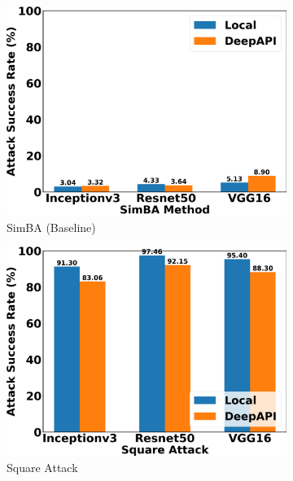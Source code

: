 \begin{figure}[tbp]
\centering
\begin{subfigure}[b]{0.32\textwidth}
    \centering
    \includegraphics[width=\textwidth]{figures/chapter_classification/simba_attack_success_rate.png}
    \caption{SimBA (Baseline)}
    \label{fig:simba_suc}
\end{subfigure}
\hfill
\begin{subfigure}[b]{0.32\textwidth}
    \centering
    \includegraphics[width=\textwidth]{figures/chapter_classification/square_attack_success_rate.png}
    \caption{Square Attack}
    \label{fig:square_suc}
\end{subfigure}
\hfill
\begin{subfigure}[b]{0.32\textwidth}

\end{subfigure}
\end{figure}
